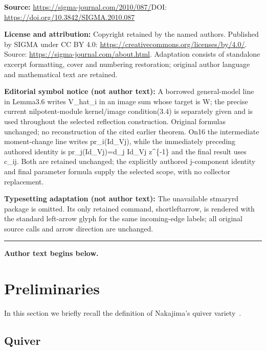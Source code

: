\documentclass[11pt]{article}
\numberwithin{equation}{section}
\theoremstyle{definition}
\begin{document}
\noindent\textbf{Source:} \url{https://sigma-journal.com/2010/087/}\quad DOI: \url{https://doi.org/10.3842/SIGMA.2010.087}\par
\noindent\textbf{License and attribution:} Copyright retained by the named authors. Published by SIGMA under CC BY 4.0: \url{https://creativecommons.org/licenses/by/4.0/}. Source: \url{https://sigma-journal.com/about.html}. Adaptation consists of standalone excerpt formatting, cover and numbering restoration; original author language and mathematical text are retained.\par
\noindent\textbf{Editorial symbol notice (not author text):} A borrowed general-model line in Lemma3.6 writes V\_hat\_i in an image sum whose target is W; the precise current nilpotent-module kernel/image condition(3.4) is separately given and is used throughout the selected reflection construction. Original formulas unchanged; no reconstruction of the cited earlier theorem. On16 the intermediate moment-change line writes pr\_i(Id\_Vj), while the immediately preceding authored identity is pr\_j(Id\_Vj)=\allowbreak{}d\_j Id\_Vj z\textasciicircum{}\{-1\} and the final result uses c\_ij. Both are retained unchanged; the explicitly authored j-component identity and final parameter formula supply the selected scope, with no collector replacement.\par
\noindent\textbf{Typesetting adaptation (not author text):} The unavailable stmaryrd package is omitted. Its only retained command, shortleftarrow, is rendered with the standard left-arrow glyph for the same incoming-edge labels; all original source calls and arrow direction are unchanged.\par
\medskip\hrule\medskip\noindent\textbf{Author text begins below.}\par
\setcounter{section}{1}
\setcounter{subsection}{0}
\setcounter{subsubsection}{0}
\setcounter{Theorem}{3}
\setcounter{equation}{0}
\section{Preliminaries}\label{sec:pre}

In this section
we brief\/ly recall the def\/inition of Nakajima's quiver variety~\cite{MR1302318}.

\subsection{Quiver}\label{subsec:quiver}
\end{document}
